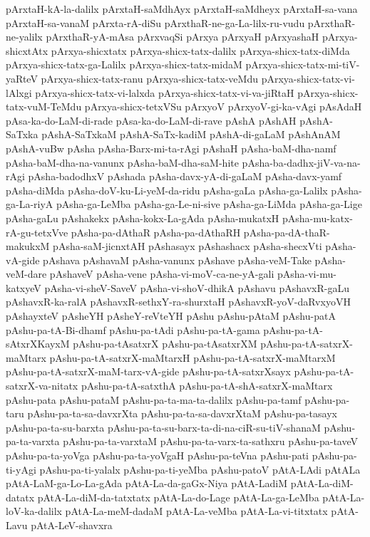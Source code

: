 {pArxtaH-kA-la-dalilx
pArxtaH-saMdhAyx
pArxtaH-saMdheyx
pArxtaH-sa-vana
pArxtaH-sa-vanaM
pArxta-rA-diSu
pArxthaR-ne-ga-La-lilx-ru-vudu
pArxthaR-ne-yalilx
pArxthaR-yA-mAsa
pArxvaqSi
pArxya
pArxyaH
pArxyashaH
pArxya-shicxtAtx
pArxya-shicxtatx
pArxya-shicx-tatx-dalilx
pArxya-shicx-tatx-diMda
pArxya-shicx-tatx-ga-Lalilx
pArxya-shicx-tatx-midaM
pArxya-shicx-tatx-mi-tiV-yaRteV
pArxya-shicx-tatx-ranu
pArxya-shicx-tatx-veMdu
pArxya-shicx-tatx-vi-lAlxgi
pArxya-shicx-tatx-vi-lalxda
pArxya-shicx-tatx-vi-va-jiRtaH
pArxya-shicx-tatx-vuM-TeMdu
pArxya-shicx-tetxVSu
pArxyoV
pArxyoV-gi-ka-vAgi
pAsAdaH
pAsa-ka-do-LaM-di-rade
pAsa-ka-do-LaM-di-rave
pAshA
pAshAH
pAshA-SaTxka
pAshA-SaTxkaM
pAshA-SaTx-kadiM
pAshA-di-gaLaM
pAshAnAM
pAshA-vuBw
pAsha
pAsha-Barx-mi-ta-rAgi
pAshaH
pAsha-baM-dha-namf
pAsha-baM-dha-na-vanunx
pAsha-baM-dha-saM-hite
pAsha-ba-dadhx-jiV-va-na-rAgi
pAsha-badodhxV
pAshada
pAsha-davx-yA-di-gaLaM
pAsha-davx-yamf
pAsha-diMda
pAsha-doV-ku-Li-yeM-da-ridu
pAsha-gaLa
pAsha-ga-Lalilx
pAsha-ga-La-riyA
pAsha-ga-LeMba
pAsha-ga-Le-ni-sive
pAsha-ga-LiMda
pAsha-ga-Lige
pAsha-gaLu
pAshakekx
pAsha-kokx-La-gAda
pAsha-mukatxH
pAsha-mu-katx-rA-gu-tetxVve
pAsha-pa-dAthaR
pAsha-pa-dAthaRH
pAsha-pa-dA-thaR-makukxM
pAsha-saM-jicnxtAH
pAshasayx
pAshashacx
pAsha-shecxVti
pAsha-vA-gide
pAshava
pAshavaM
pAsha-vanunx
pAshave
pAsha-veM-Take
pAsha-veM-dare
pAshaveV
pAsha-vene
pAsha-vi-moV-ca-ne-yA-gali
pAsha-vi-mu-katxyeV
pAsha-vi-sheV-SaveV
pAsha-vi-shoV-dhikA
pAshavu
pAshavxR-gaLu
pAshavxR-ka-ralA
pAshavxR-sethxY-ra-shurxtaH
pAshavxR-yoV-daRvxyoVH
pAshayxteV
pAsheYH
pAsheY-reVteYH
pAshu
pAshu-pAtaM
pAshu-patA
pAshu-pa-tA-Bi-dhamf
pAshu-pa-tAdi
pAshu-pa-tA-gama
pAshu-pa-tA-sAtxrXKayxM
pAshu-pa-tAsatxrX
pAshu-pa-tAsatxrXM
pAshu-pa-tA-satxrX-maMtarx
pAshu-pa-tA-satxrX-maMtarxH
pAshu-pa-tA-satxrX-maMtarxM
pAshu-pa-tA-satxrX-maM-tarx-vA-gide
pAshu-pa-tA-satxrXsayx
pAshu-pa-tA-satxrX-va-nitatx
pAshu-pa-tA-satxthA
pAshu-pa-tA-shA-satxrX-maMtarx
pAshu-pata
pAshu-pataM
pAshu-pa-ta-ma-ta-dalilx
pAshu-pa-tamf
pAshu-pa-taru
pAshu-pa-ta-sa-davxrXta
pAshu-pa-ta-sa-davxrXtaM
pAshu-pa-tasayx
pAshu-pa-ta-su-barxta
pAshu-pa-ta-su-barx-ta-di-na-ciR-su-tiV-shanaM
pAshu-pa-ta-varxta
pAshu-pa-ta-varxtaM
pAshu-pa-ta-varx-ta-sathxru
pAshu-pa-taveV
pAshu-pa-ta-yoVga
pAshu-pa-ta-yoVgaH
pAshu-pa-teVna
pAshu-pati
pAshu-pa-ti-yAgi
pAshu-pa-ti-yalalx
pAshu-pa-ti-yeMba
pAshu-patoV
pAtA-LAdi
pAtALa
pAtA-LaM-ga-Lo-La-gAda
pAtA-La-da-gaGx-Niya
pAtA-LadiM
pAtA-La-diM-datatx
pAtA-La-diM-da-tatxtatx
pAtA-La-do-Lage
pAtA-La-ga-LeMba
pAtA-La-loV-ka-dalilx
pAtA-La-meM-dadaM
pAtA-La-veMba
pAtA-La-vi-titxtatx
pAtA-Lavu
pAtA-LeV-shavxra
}
